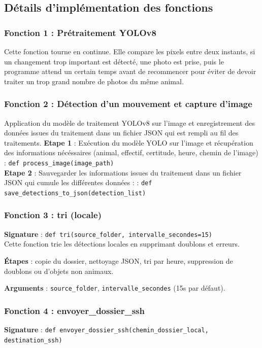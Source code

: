 \documentclass[a4paper,11pt]{article}
\begin{document}
	\subsection{Détails d’implémentation des fonctions}
	
	\subsubsection*{Fonction 1 : Prétraitement YOLOv8}
	Cette fonction tourne en continue. Elle compare les pixels entre deux instants, si un changement trop important est détecté, une photo est prise, puis le programme attend un certain temps avant de recommencer pour éviter de devoir traiter un trop grand nombre de photos du même animal.
	
	\subsubsection*{Fonction 2 : Détection d'un mouvement et capture d'image}
	Application du modèle de traitement YOLOv8 sur l'image et enregistrement des données issues du traitement dans un fichier JSON qui est rempli au fil des traitements.
	\textbf{Etape 1} : Exécution du modèle YOLO sur l'image et récupération des informations nécéssaires (animal, effectif, certitude, heure, chemin de l'image) : \texttt{def process\_image(image\_path)} \\
	\textbf{Etape 2 }: Sauvegarder les informations issues du traitement dans un fichier JSON qui cumule les différentes données : : \texttt{def save\_detections\_to\_json(detection\_list)}
	
	\subsubsection*{Fonction 3 : tri (locale)}
	\textbf{Signature} : \texttt{def tri(source\_folder, intervalle\_secondes=15)} \\
	
	Cette fonction trie les détections locales en supprimant doublons et erreurs.
	
	\textbf{Étapes} : copie du dossier, nettoyage JSON, tri par heure, suppression de doublons ou d'objets non animaux.
	
	\textbf{Arguments} : \texttt{source\_folder}, \texttt{intervalle\_secondes} (15s par défaut).
	
	\subsubsection*{Fonction 4 : envoyer\_dossier\_ssh}
	\textbf{Signature} : \texttt{def envoyer\_dossier\_ssh(chemin\_dossier\_local, destination\_ssh)} \\
	
\end{document}

